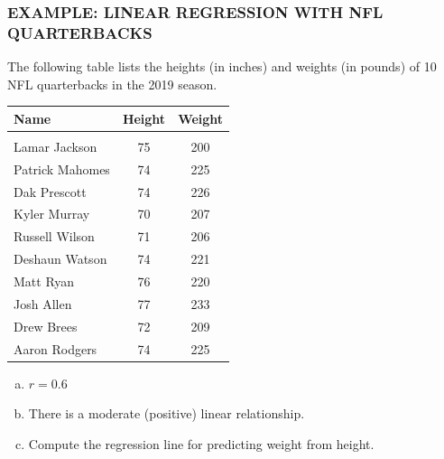\documentclass[8pt]{beamer}
\newcommand{\extitle}[1]{\frametitle{\fontfamily{fvs}\selectfont \small\color{black!70!blue!80!cyan}\uppercase{\bfseries Example: #1}}}
\def\solblank{\begin{tcolorbox}[colframe=black!50!blue!50!cyan,
colback=white,
bottomrule=0mm,
rightrule=0mm,
sharp corners=all] 
\vspace{6in}
\text{}
\end{tcolorbox}}
\begin{document}
\begin{frame}
\extitle{Linear Regression with NFL Quarterbacks}
The following table lists the heights (in inches) and weights (in pounds) of 10 NFL quarterbacks in the 2019 season.
{\footnotesize\begin{center}
\begin{tabular}{l c c}
\textbf{Name} & \textbf{Height} & \textbf{Weight}\\
\hline
& & \\
Lamar Jackson & 75 & 200\\
Patrick Mahomes & 74 & 225\\
Dak Prescott & 74 & 226\\
Kyler Murray & 70 & 207\\
Russell Wilson & 71 & 206\\
Deshaun Watson & 74 & 221\\
Matt Ryan & 76 & 220\\
Josh Allen & 77 & 233\\
Drew Brees & 72 & 209\\
Aaron Rodgers & 74 & 225\\
\end{tabular}
\end{center}}
\begin{enumerate}[(a)]
\item $r = 0.6$
\item There is a moderate (positive) linear relationship.
\item Compute the regression line for predicting weight from height.
\end{enumerate}

\solblank
\end{frame}
\end{document}
